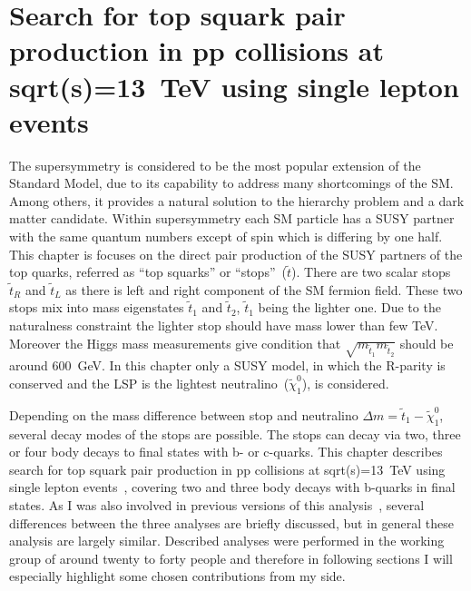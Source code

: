 \chapter{Search for top squark pair production in pp collisions at sqrt(s)=13~TeV using single lepton events}


The supersymmetry is considered to be the most popular extension of the Standard Model, due to its capability to address many shortcomings of the SM. Among others, it provides a natural solution to the hierarchy problem and a dark matter candidate. Within supersymmetry each SM particle has a SUSY partner with the same quantum numbers except of spin which is differing by one half. This chapter is focuses on the direct pair production of the SUSY partners of the top quarks, referred as ``top squarks'' or ``stops''~($\tilde{t}$). There are two scalar stops $\tilde{t}_{R}$ and  $\tilde{t}_{L}$ as there is left and right component of the SM fermion field. These two stops mix into mass eigenstates $\tilde{t}_{1}$ and $\tilde{t}_{2}$,  $\tilde{t}_{1}$ being the lighter one. Due to the naturalness constraint the lighter stop should have mass lower than few TeV. Moreover the Higgs mass measurements give condition that $\sqrt{m_{\tilde{t}_{1}} m_{\tilde{t}_{2}}}$ should be around 600~GeV. In this chapter only a SUSY model, in which the R-parity is conserved and the LSP is the lightest neutralino~($\tilde{\chi}^{0}_{1}$), is considered.

Depending on the mass difference between stop and neutralino $\Delta m = \tilde{t}_{1} - \tilde{\chi}^{0}_{1}$, several decay modes of the stops are possible. The stops can decay via two, three or four body decays to final states with b- or c-quarks. This chapter describes search for top squark pair production in pp collisions at sqrt(s)=13~TeV using single lepton events~\cite{Sirunyan:2017xse}, covering two and three body decays with b-quarks in final states. As I was also involved in previous versions of this analysis~\cite{Sirunyan:2016jpr, CMS:2016vew}, several differences between the three analyses are briefly discussed, but in general these analysis are largely similar. Described analyses were performed in the working group of around twenty to forty people and therefore in following sections I will especially highlight some chosen contributions from my side.

